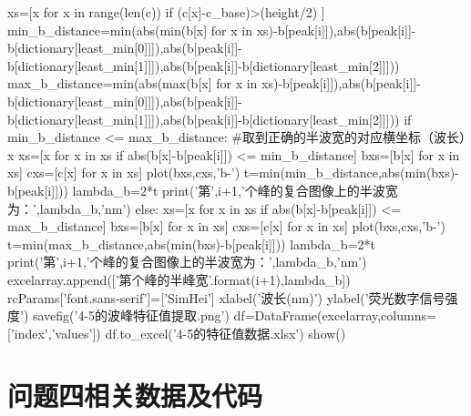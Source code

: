 \documentclass{article}
\numberwithin{equation}{subsection}
\begin{document}
\begin{python}
    xs=[x for x in range(len(c)) if (c[x]-c_base)>(height/2) ]
    min_b_distance=min(abs(min(b[x] for x in xs)-b[peak[i]]),abs(b[peak[i]]-b[dictionary[least_min[0]]]),abs(b[peak[i]]-b[dictionary[least_min[1]]]),abs(b[peak[i]]-b[dictionary[least_min[2]]]))
    max_b_distance=min(abs(max(b[x] for x in xs)-b[peak[i]]),abs(b[peak[i]]-b[dictionary[least_min[0]]]),abs(b[peak[i]]-b[dictionary[least_min[1]]]),abs(b[peak[i]]-b[dictionary[least_min[2]]]))   
    if min_b_distance <= max_b_distance:                #取到正确的半波宽的对应横坐标（波长）x
        xs=[x for x in xs if abs(b[x]-b[peak[i]]) <= min_b_distance]
        bxs=[b[x] for x in xs]
        cxs=[c[x] for x in xs]
        plot(bxs,cxs,'b-')
        t=min(min_b_distance,abs(min(bxs)-b[peak[i]]))
        lambda_b=2*t
        print('第',i+1,'个峰的复合图像上的半波宽为：',lambda_b,'nm')
    else:
        xs=[x for x in xs if abs(b[x]-b[peak[i]]) <= max_b_distance]
        bxs=[b[x] for x in xs]
        cxs=[c[x] for x in xs]
        plot(bxs,cxs,'b-')
        t=min(max_b_distance,abs(min(bxs)-b[peak[i]]))
        lambda_b=2*t
        print('第',i+1,'个峰的复合图像上的半波宽为：',lambda_b,'nm')
    excelarray.append(['第{}个峰的半峰宽'.format(i+1),lambda_b])
rcParams['font.sans-serif']=['SimHei']
xlabel('波长(nm)')
ylabel('荧光数字信号强度')
savefig('4-5的波峰特征值提取.png')
df=DataFrame(excelarray,columns=['index','values'])
df.to_excel('4-5的特征值数据.xlsx')
show()
    
\end{python}





\section{问题四相关数据及代码}
\end{document}
